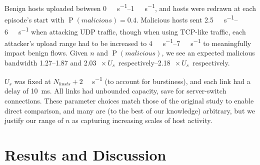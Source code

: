\documentclass[10pt, times, conference, letterpaper]{IEEEtran}
\begin{document}
Benign hosts uploaded between \SIrange{0}{1}{\mega\bit\per\second}, and hosts were redrawn at each episode's start with $\operatorname{P}(\mathit{malicious})=0.4$.
Malicious hosts sent \SIrange{2.5}{6}{\mega\bit\per\second} when attacking UDP traffic, though when using TCP-like traffic, each attacker's upload range had to be increased to \SIrange{4}{7}{\mega\bit\per\second} to meaningfully impact benign flows.
Given $n$ and $\operatorname{P}(\mathit{malicious})$, we see an expected malicious bandwidth \numrange{1.27}{1.87} and \SIrange{2.03}{2.18}{$\! \times U_s$} respectively.

$U_s$ was fixed at $N_{\mathit{hosts}}+2$ \si{\mega\bit\per\second} (to account for burstiness), and each link had a delay of \SI{10}{\milli\second}.
All links had unbounded capacity, save for server-switch connections.
These parameter choices match those of the original study to enable direct comparison, and many are (to the best of our knowledge) arbitrary, but we justify our range of $n$ as capturing increasing scales of host activity.

\section{Results and Discussion}
\label{sec:the-results-of-doing-so}
\end{document}
